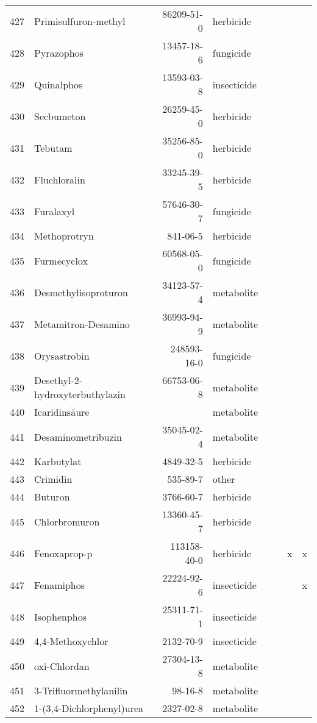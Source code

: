 \begin{longtable}{lp{4cm}rlp{1cm}p{1.5cm}p{1.5cm}p{1cm}}
  427 & Primisulfuron-methyl & 86209-51-0 & herbicide &  &  &  &  \\ 
  428 & Pyrazophos & 13457-18-6 & fungicide &  &  &  &  \\ 
  429 & Quinalphos & 13593-03-8 & insecticide &  &  &  &  \\ 
  430 & Secbumeton & 26259-45-0 & herbicide &  &  &  &  \\ 
  431 & Tebutam & 35256-85-0 & herbicide &  &  &  &  \\ 
  432 & Fluchloralin & 33245-39-5 & herbicide &  &  &  &  \\ 
  433 & Furalaxyl & 57646-30-7 & fungicide &  &  &  &  \\ 
  434 & Methoprotryn & 841-06-5 & herbicide &  &  &  &  \\ 
  435 & Furmecyclox & 60568-05-0 & fungicide &  &  &  &  \\ 
  436 & Desmethylisoproturon & 34123-57-4 & metabolite &  &  &  &  \\ 
  437 & Metamitron-Desamino & 36993-94-9 & metabolite &  &  &  &  \\ 
  438 & Orysastrobin & 248593-16-0 & fungicide &  &  &  &  \\ 
  439 & Desethyl-2-hydroxyterbuthylazin & 66753-06-8 & metabolite &  &  &  &  \\ 
  440 & Icaridinsäure &  & metabolite &  &  &  &  \\ 
  441 & Desaminometribuzin & 35045-02-4 & metabolite &  &  &  &  \\ 
  442 & Karbutylat & 4849-32-5 & herbicide &  &  &  &  \\ 
  443 & Crimidin & 535-89-7 & other &  &  &  &  \\ 
  444 & Buturon & 3766-60-7 & herbicide &  &  &  &  \\ 
  445 & Chlorbromuron & 13360-45-7 & herbicide &  &  &  &  \\ 
  446 & Fenoxaprop-p & 113158-40-0 & herbicide &  &  & x & x \\ 
  447 & Fenamiphos & 22224-92-6 & insecticide &  &  &  & x \\ 
  448 & Isophenphos & 25311-71-1 & insecticide &  &  &  &  \\ 
  449 & 4,4-Methoxychlor & 2132-70-9 & insecticide &  &  &  &  \\ 
  450 & oxi-Chlordan & 27304-13-8 & metabolite &  &  &  &  \\ 
  451 & 3-Trifluormethylanilin & 98-16-8 & metabolite &  &  &  &  \\ 
  452 & 1-(3,4-Dichlorphenyl)urea & 2327-02-8 & metabolite &  &  &  &  \\ 

\end{longtable}
